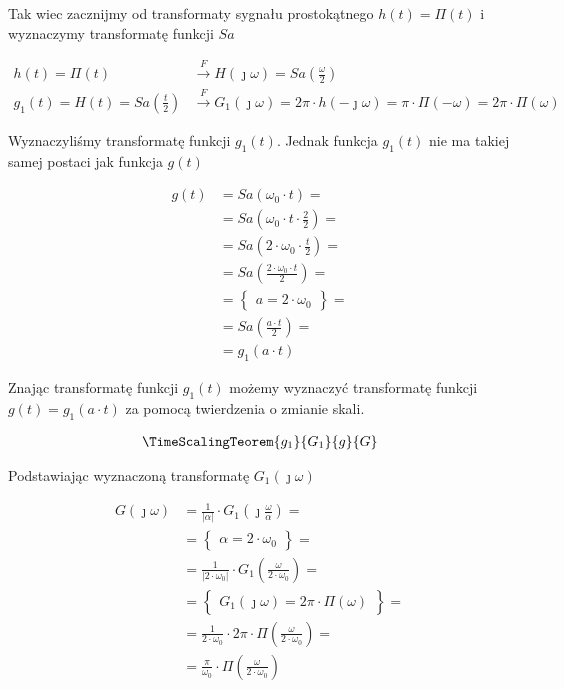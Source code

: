 \begin{task}
Tak wiec zacznijmy od transformaty sygnału prostokątnego $h(t)=\Pi(t)$ i wyznaczymy transformatę funkcji $Sa$

\begin{align*}
h(t)=\Pi(t) &\overset{F}{\rightarrow} H(\jmath \omega) = Sa\left(\frac{\omega}{2}\right)\\
g_1(t) = H(t) = Sa\left(\frac{t}{2}\right) &\overset{F}{\rightarrow} 
G_1(\jmath \omega) = 2\pi \cdot h(- \jmath \omega) = \pi \cdot  \Pi\left(-\omega\right) = 2\pi \cdot  \Pi\left(\omega\right)
\end{align*}

Wyznaczyliśmy transformatę funkcji $g_1(t)$. Jednak funkcja $g_1(t)$ nie ma takiej samej postaci jak funkcja $g(t)$ 

\begin{align*}
g(t)&=Sa\left(\omega_0 \cdot t\right)=\\
&=Sa\left(\omega_0 \cdot t \cdot \frac{2}{2}\right)=\\
&=Sa\left(2\cdot \omega_0 \cdot \frac{t}{2}\right)=\\
&=Sa\left(\frac{2\cdot \omega_0 \cdot t}{2}\right)=\\
&=\begin{Bmatrix}
a = 2\cdot \omega_0
\end{Bmatrix}=\\
&=Sa\left(\frac{a\cdot t}{2}\right)=\\
&=g_1(a\cdot t) 
\end{align*}

Znając transformatę funkcji $g_1(t)$ możemy wyznaczyć transformatę funkcji $g(t)=g_1(a \cdot t)$ za pomocą twierdzenia o zmianie skali.

\begin{align*}
\TimeScalingTeorem{g_1}{G_1}{g}{G}
\end{align*}

Podstawiając wyznaczoną transformatę $G_1(\jmath \omega)$

\begin{align*}
G(\jmath \omega) &= \frac{1}{\left|\alpha \right|} \cdot G_1(\jmath \frac{\omega}{\alpha})=\\
&=\begin{Bmatrix}
\alpha = 2\cdot \omega_0
\end{Bmatrix}=\\
&=\frac{1}{\left| 2\cdot \omega_0 \right|} \cdot G_1( \frac{\omega}{2\cdot \omega_0})=\\
&=\begin{Bmatrix}
G_1(\jmath \omega) = 2\pi \cdot \Pi\left(\omega\right)
\end{Bmatrix}=\\
&=\frac{1}{ 2\cdot \omega_0 } \cdot 2\pi \cdot \Pi\left( \frac{\omega}{2\cdot \omega_0}\right)=\\
&=\frac{\pi}{ \omega_0 } \cdot \Pi\left( \frac{\omega}{2\cdot \omega_0}\right)
\end{align*}


\end{task}
